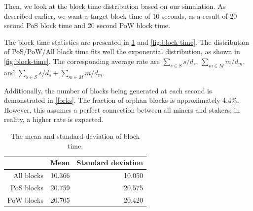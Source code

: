 \documentclass[a4paper]{article}
\begin{document}
Then, we look at the block time distribution based on our simulation. As described earlier, we want a target block time of 10 seconds, as a result of 20 second PoS block time and 20 second PoW block time.

The block time statistics are presented in \cref{table:block-time} and \cref{fig:block-time}. The distribution of PoS/PoW/All block time fits well the exponential distribution, as shown in \cref{fig:block-time}. The corresponding average rate are $\sum_{s \in S}{s} / d_s$, $\sum_{m \in M}{m} / d_m$, and $\sum_{s \in S}{s} / d_s + \sum_{m \in M}{m} / d_m$.

Additionally, the number of blocks being generated at each second is demonstrated in \cref{forks}. The fraction of orphan blocks is approximately 4.4\%. However, this assumes a perfect connection between all miners and stakers; in reality, a higher rate is expected.

\begin{table}
\centering
\begin{tabular}{@{}rrr@{}}
\toprule
& Mean & Standard deviation \\ \midrule
All blocks & 10.366 & 10.050 \\
PoS blocks & 20.759 & 20.575 \\
PoW blocks & 20.705 & 20.420 \\
\bottomrule

\end{tabular}
\caption{The mean and standard deviation of block time.}
\label{table:block-time}
\end{table}
\end{document}
